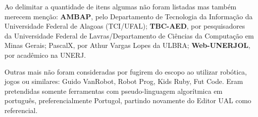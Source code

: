 Ao delimitar a quantidade de itens algumas não foram listadas mas também merecem menção: \textbf{AMBAP}, pelo Departamento de Tecnologia da Informação da Universidade Federal de Alagoas (TCI/UFAL); \textbf{TBC-AED}, por pesquisadores da Universidade Federal de Lavras/Departamento de Ciências da Computação em Minas Gerais; PascalX, por Athur Vargas Lopes da ULBRA; \textbf{Web-UNERJOL}\nocite{ferrandin2005etal}, por acadêmico na UNERJ.

Outras mais não foram consideradas por fugirem do escopo ao utilizar robótica, jogos ou similares: Guido VanRobot, Robot Prog, Kids Ruby, Fut Code. Eram pretendidas somente ferramentas com pseudo-linguagem algorítmica em português, preferencialmente Portugol, partindo novamente do Editor UAL como referencial.

